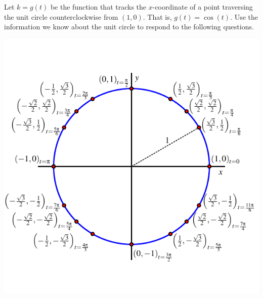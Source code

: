 \documentclass[nooutcomes]{ximera}
\begin{document}
\begin{exploration}
Let \(k = g(t)\) be the function that tracks the \(x\)-coordinate of a point traversing the unit circle counterclockwise from \((1,0)\).  That is, \(g(t) = \cos(t)\).  Use the information we know about the unit circle to respond to the following questions.

\begin{image}
\includegraphics{unit-circle-16-all-labeled.pdf}
\end{image}


\end{exploration}
\end{document}
